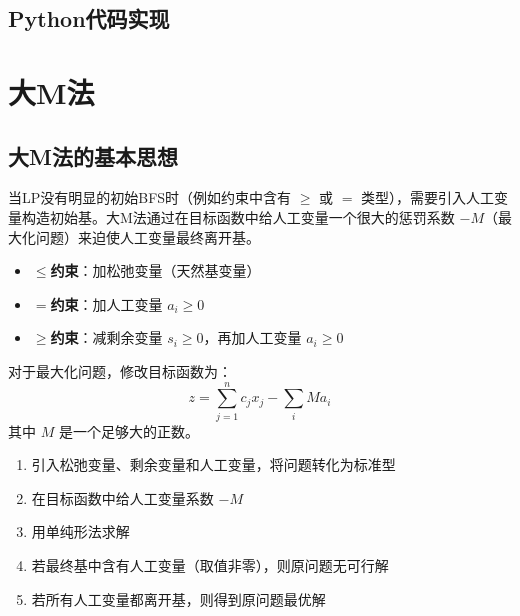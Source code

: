 \subsection{Python代码实现}\label{sec:simplex-code}

\section{大M法}\label{sec:bigM}

\subsection{大M法的基本思想}

当LP没有明显的初始BFS时（例如约束中含有 $\geq$ 或 $=$ 类型），需要引入人工变量构造初始基。大M法通过在目标函数中给人工变量一个很大的惩罚系数 $-M$（最大化问题）来迫使人工变量最终离开基。

\begin{conceptbox}[人工变量的引入]
\begin{itemize}
    \item \textbf{$\leq$约束}：加松弛变量（天然基变量）
    \item \textbf{$=$约束}：加人工变量 $a_i \geq 0$
    \item \textbf{$\geq$约束}：减剩余变量 $s_i \geq 0$，再加人工变量 $a_i \geq 0$
\end{itemize}
\end{conceptbox}

\begin{definition}[大M法的目标函数]
对于最大化问题，修改目标函数为：
\[
z = \sum_{j=1}^n c_j x_j - \sum_{i} M a_i
\]
其中 $M$ 是一个足够大的正数。
\end{definition}

\begin{algobox}[大M法算法]
\begin{enumerate}
    \item 引入松弛变量、剩余变量和人工变量，将问题转化为标准型
    \item 在目标函数中给人工变量系数 $-M$
    \item 用单纯形法求解
    \item 若最终基中含有人工变量（取值非零），则原问题无可行解
    \item 若所有人工变量都离开基，则得到原问题最优解
\end{enumerate}
\end{algobox}

